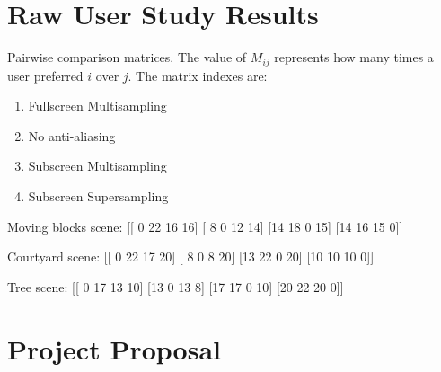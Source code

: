 \documentclass[12pt,a4paper,twoside,openright]{report}
\begin{document}
\chapter{Raw User Study Results}

Pairwise comparison matrices. The value of $M_{ij}$ represents how many times a user preferred $i$ over $j$.
The matrix indexes are:
\begin{enumerate}
	\item Fullscreen Multisampling
	\item No anti-aliasing 
	\item Subscreen Multisampling
	\item Subscreen Supersampling
\end{enumerate}

\begin{blockcode}
Moving blocks scene:
[[ 0 22 16 16]
 [ 8  0 12 14]
 [14 18  0 15]
 [14 16 15  0]]

Courtyard scene:
[[ 0 22 17 20]
 [ 8  0  8 20]
 [13 22  0 20]
 [10 10 10  0]]

Tree scene:
[[ 0 17 13 10]
 [13  0 13  8]
 [17 17  0 10]
 [20 22 20  0]]
\end{blockcode}
\chapter{Project Proposal}


\end{document}
